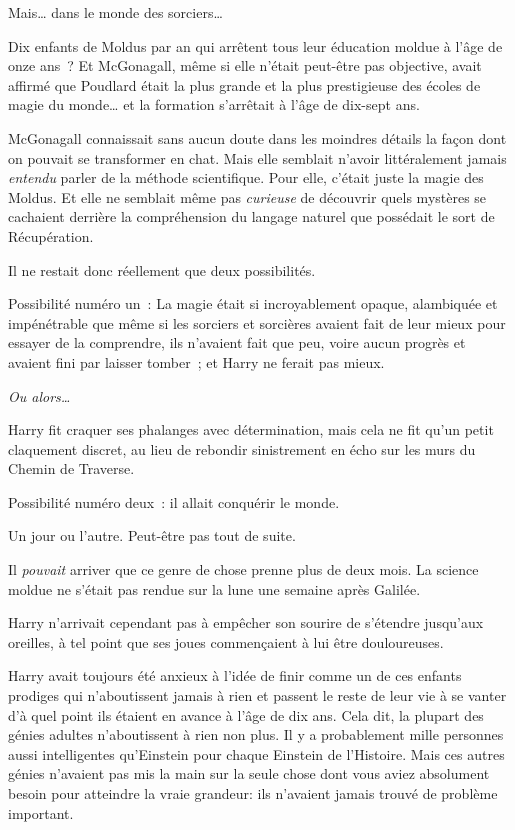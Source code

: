 Mais… dans le monde des sorciers…

Dix enfants de Moldus par an qui arrêtent tous leur éducation moldue à l'âge de onze ans~?
Et McGonagall, même si elle n'était peut-être pas objective, avait affirmé que Poudlard était la plus grande et la plus prestigieuse des écoles de magie du monde… et la formation s'arrêtait à l'âge de dix-sept ans.

McGonagall connaissait sans aucun doute dans les moindres détails la façon dont on pouvait se transformer en chat.
Mais elle semblait n'avoir littéralement jamais \emph{entendu} parler de la méthode scientifique.
Pour elle, c'était juste la magie des Moldus.
Et elle ne semblait même pas \emph{curieuse} de découvrir quels mystères se cachaient derrière la compréhension du langage naturel que possédait le sort de Récupération.

Il ne restait donc réellement que deux possibilités.

Possibilité numéro un~: La magie était si incroyablement opaque, alambiquée et impénétrable que même si les sorciers et sorcières avaient fait de leur mieux pour essayer de la comprendre, ils n'avaient fait que peu, voire aucun progrès et avaient fini par laisser tomber~; et Harry ne ferait pas mieux.

\emph{Ou alors…}

Harry fit craquer ses phalanges avec détermination, mais cela ne fit qu'un petit claquement discret, au lieu de rebondir sinistrement en écho sur les murs du Chemin de Traverse.

Possibilité numéro deux~: il allait conquérir le monde.

Un jour ou l'autre. Peut-être pas tout de suite.

Il \emph{pouvait} arriver que ce genre de chose prenne plus de deux mois.
La science moldue ne s'était pas rendue sur la lune une semaine après Galilée.

Harry n'arrivait cependant pas à empêcher son sourire de s'étendre jusqu'aux oreilles, à tel point que ses joues commençaient à lui être douloureuses.

Harry avait toujours été anxieux à l'idée de finir comme un de ces enfants prodiges qui n'aboutissent jamais à rien et passent le reste de leur vie à se vanter d'à quel point ils étaient en avance à l'âge de dix ans.
Cela dit, la plupart des génies adultes n'aboutissent à rien non plus.
Il y a probablement mille personnes aussi intelligentes qu'Einstein pour chaque Einstein de l'Histoire.
Mais ces autres génies n'avaient pas mis la main sur la seule chose dont vous aviez absolument besoin pour atteindre la vraie grandeur: ils n'avaient jamais trouvé de problème important.

